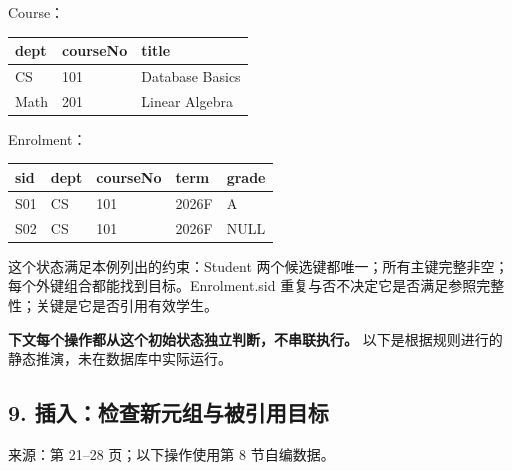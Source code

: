 Course：

\begin{longtable}[]{@{}lll@{}}
\toprule\noalign{}
dept & courseNo & title \\
\midrule\noalign{}
\endhead
\bottomrule\noalign{}
\endlastfoot
CS & 101 & Database Basics \\
Math & 201 & Linear Algebra \\
\end{longtable}

Enrolment：

\begin{longtable}[]{@{}lllll@{}}
\toprule\noalign{}
sid & dept & courseNo & term & grade \\
\midrule\noalign{}
\endhead
\bottomrule\noalign{}
\endlastfoot
S01 & CS & 101 & 2026F & A \\
S02 & CS & 101 & 2026F & NULL \\
\end{longtable}

这个状态满足本例列出的约束：Student 两个候选键都唯一；所有主键完整非空；每个外键组合都能找到目标。Enrolment.sid 重复与否不决定它是否满足参照完整性；关键是它是否引用有效学生。

\textbf{下文每个操作都从这个初始状态独立判断，不串联执行。} 以下是根据规则进行的静态推演，未在数据库中实际运行。

\subsection{9. 插入：检查新元组与被引用目标}\label{03_relational_model_and_integrity_zh-ux63d2ux5165ux68c0ux67e5ux65b0ux5143ux7ec4ux4e0eux88abux5f15ux7528ux76eeux6807}

来源：第 21--28 页；以下操作使用第 8 节自编数据。

